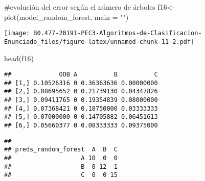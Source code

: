 \documentclass[]{article}
\newenvironment{Shaded}{\begin{snugshade}}{\end{snugshade}}
\newcommand{\KeywordTok}[1]{\textcolor[rgb]{0.94,0.87,0.69}{#1}}
\newcommand{\DataTypeTok}[1]{\textcolor[rgb]{0.87,0.87,0.75}{#1}}
\newcommand{\DecValTok}[1]{\textcolor[rgb]{0.86,0.86,0.80}{#1}}
\newcommand{\StringTok}[1]{\textcolor[rgb]{0.80,0.58,0.58}{#1}}
\newcommand{\CommentTok}[1]{\textcolor[rgb]{0.50,0.62,0.50}{#1}}
\newcommand{\OperatorTok}[1]{\textcolor[rgb]{0.94,0.94,0.82}{#1}}
\newcommand{\NormalTok}[1]{\textcolor[rgb]{0.80,0.80,0.80}{#1}}
\begin{document}
\begin{Shaded}
\begin{Highlighting}[]
\CommentTok{#evolución del error según el número de árboles}
\NormalTok{f16<-}\KeywordTok{plot}\NormalTok{(model_random_forest, }\DataTypeTok{main =} \StringTok{""}\NormalTok{)  }
\end{Highlighting}
\end{Shaded}

\texttt{[image: B0.477-20191-PEC3-Algoritmos-de-Clasificacion-Enunciado\_files/figure-latex/unnamed-chunk-11-2.pdf]}

\begin{Shaded}
\begin{Highlighting}[]
\KeywordTok{head}\NormalTok{(f16)}
\end{Highlighting}
\end{Shaded}

\begin{verbatim}
##             OOB A          B          C
## [1,] 0.10526316 0 0.36363636 0.00000000
## [2,] 0.08695652 0 0.21739130 0.04347826
## [3,] 0.09411765 0 0.19354839 0.08000000
## [4,] 0.07368421 0 0.18750000 0.03333333
## [5,] 0.07000000 0 0.14705882 0.06451613
## [6,] 0.05660377 0 0.08333333 0.09375000
\end{verbatim}

\begin{Shaded}
\end{Shaded}

\begin{verbatim}
##                    
## preds_random_forest  A  B  C
##                   A 10  0  0
##                   B  0 12  1
##                   C  0  0 15
\end{verbatim}

\begin{Shaded}
\end{Shaded}
\end{document}
